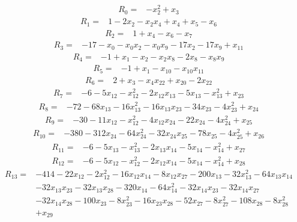 \begingroup\small
\[\begin{aligned}R_{0}={}&-x_{2}^{2}+x_{3}
\end{aligned}\]
\[\begin{aligned}R_{1}={}&1-2x_{2}-x_{2}x_{4}+x_{4}+x_{5}-x_{6}
\end{aligned}\]
\[\begin{aligned}R_{2}={}&1+x_{4}-x_{6}-x_{7}
\end{aligned}\]
\[\begin{aligned}R_{3}={}&-17-x_{0}-x_{0}x_{2}-x_{0}x_{9}-17x_{2}-17x_{9}+x_{11}
\end{aligned}\]
\[\begin{aligned}R_{4}={}&-1+x_{1}-x_{2}-x_{2}x_{8}-2x_{8}-x_{8}x_{9}
\end{aligned}\]
\[\begin{aligned}R_{5}={}&-1+x_{1}-x_{10}-x_{10}x_{11}
\end{aligned}\]
\[\begin{aligned}R_{6}={}&2+x_{3}-x_{4}x_{22}+x_{20}-2x_{22}
\end{aligned}\]
\[\begin{aligned}R_{7}={}&-6-5x_{12}-x_{12}^{2}-2x_{12}x_{13}-5x_{13}-x_{13}^{2}+x_{23}
\end{aligned}\]
\[\begin{aligned}R_{8}={}&-72-68x_{13}-16x_{13}^{2}-16x_{13}x_{23}-34x_{23}-4x_{23}^{2}+x_{24}
\end{aligned}\]
\[\begin{aligned}R_{9}={}&-30-11x_{12}-x_{12}^{2}-4x_{12}x_{24}-22x_{24}-4x_{24}^{2}+x_{25}
\end{aligned}\]
\[\begin{aligned}R_{10}={}&-380-312x_{24}-64x_{24}^{2}-32x_{24}x_{25}-78x_{25}-4x_{25}^{2}+x_{26}
\end{aligned}\]
\[\begin{aligned}R_{11}={}&-6-5x_{13}-x_{13}^{2}-2x_{13}x_{14}-5x_{14}-x_{14}^{2}+x_{27}
\end{aligned}\]
\[\begin{aligned}R_{12}={}&-6-5x_{12}-x_{12}^{2}-2x_{12}x_{14}-5x_{14}-x_{14}^{2}+x_{28}
\end{aligned}\]
\[\begin{aligned}R_{13}={}&-414-22x_{12}-2x_{12}^{2}-16x_{12}x_{14}-8x_{12}x_{27}-200x_{13}-32x_{13}^{2}-64x_{13}x_{14}
\\&-32x_{13}x_{23}-32x_{13}x_{28}-320x_{14}-64x_{14}^{2}-32x_{14}x_{23}-32x_{14}x_{27}
\\&-32x_{14}x_{28}-100x_{23}-8x_{23}^{2}-16x_{23}x_{28}-52x_{27}-8x_{27}^{2}-108x_{28}-8x_{28}^{2}
\\&+x_{29}
\end{aligned}\]
